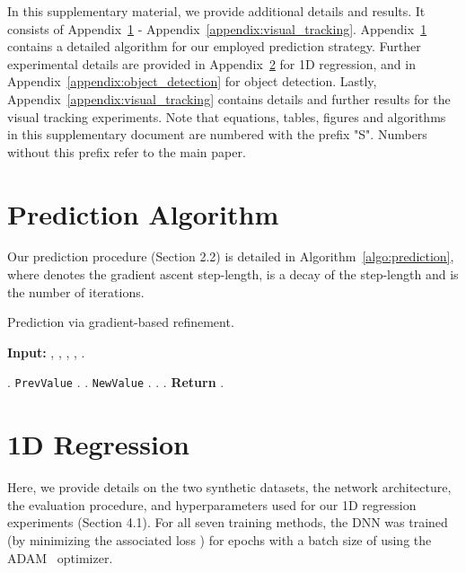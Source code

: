 \documentclass{bmvc2k}
\begin{document}
In this supplementary material, we provide additional details and results. It consists of Appendix~\ref{appendix:prediciton} - Appendix~\ref{appendix:visual_tracking}. Appendix~\ref{appendix:prediciton} contains a detailed algorithm for our employed prediction strategy. Further experimental details are provided in Appendix~\ref{appendix:1dregression} for 1D regression, and in Appendix~\ref{appendix:object_detection} for object detection. Lastly, Appendix~\ref{appendix:visual_tracking} contains details and further results for the visual tracking experiments. Note that equations, tables, figures and algorithms in this supplementary document are numbered with the prefix "S". Numbers without this prefix refer to the main paper.

\appendix
\begin{appendices}
\section{Prediction Algorithm}
\label{appendix:prediciton}
Our prediction procedure (Section 2.2) is detailed in Algorithm~\ref{algo:prediction}, where  denotes the gradient ascent step-length,  is a decay of the step-length and  is the number of iterations.

\begin{algorithm}
\caption{Prediction via gradient-based refinement.}
\label{algo:prediction}
\textbf{Input:} , , , , .
\begin{algorithmic}[1]
    \State .
    \For{\texttt{}}
        \State \texttt{PrevValue}  .
        \State .
        \State \texttt{NewValue}  .
        \If { }
            \State .
        \Else
            \State .
        \EndIf
    \EndFor
    \State \textbf{Return} .
\end{algorithmic}
\end{algorithm}\vspace{-3mm} \section{1D Regression}
\label{appendix:1dregression}
Here, we provide details on the two synthetic datasets, the network architecture, the evaluation procedure, and hyperparameters used for our 1D regression experiments (Section 4.1). For all seven training methods, the DNN  was trained (by minimizing the associated loss ) for  epochs with a batch size of  using the ADAM~\cite{kingma2014adam} optimizer.







\end{appendices}
\end{document}
